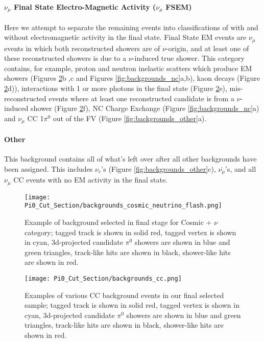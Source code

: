 \paragraph{ $\nu_\mu$ Final State Electro-Magnetic Activity ($\nu_\mu$ FSEM)}
Here we attempt to separate the remaining events into classifications of with and without electromagnetic activity in the final state.  Final State EM events are $\nu_\mu$ events in which both reconstructed showers are of $\nu$-origin, and at least one of these reconstructed showers is due to a $\nu$-induced true shower. This category contains, for example, proton and neutron inelastic scatters which produce EM showers (Figures \ref{fig:backgrounds_cc}b ,c and Figures \ref{fig:backgrounds_nc}a,b), kaon decays (Figure \ref{fig:backgrounds_cc}d)),  interactions with 1 or more photons in the final state (Figure \ref{fig:backgrounds_cc}e), mis-reconstructed events where at least one reconstructed candidate is from a $\nu$-induced shower (Figure \ref{fig:backgrounds_cc}f), NC Charge Exchange (Figure \ref{fig:backgrounds_nc}a) and $\nu_\mu$ CC 1$\pi^0$ out of the FV (Figure \ref{fig:backgrounds_other}a).

\paragraph{Other}
This background contains all of what's left over after all other backgrounds have been assigned.  This includes $\nu_e$'s (Figure \ref{fig:backgrounds_other}c), $\overline{\nu_\mu}$'s, and all $\nu_\mu$ CC events with no EM activity in the final state.

\begin{figure}[h!]
\centering
\texttt{[image: Pi0\_Cut\_Section/backgrounds\_cosmic\_neutrino\_flash.png]}
\caption{ Example of background selected in final stage for Cosmic + $\nu$ category; tagged track is shown in solid red, tagged vertex is shown in cyan, 3d-projected candidate $\pi^0$ showers are shown in blue and green triangles, track-like hits are shown in black, shower-like hits are shown in red. }
\label{fig:backgrounds_cosmic_nuflash}
\end{figure}


\begin{figure}[h!]
\centering
\texttt{[image: Pi0\_Cut\_Section/backgrounds\_cc.png]}
\caption{ Examples of various CC background events in our final selected sample; tagged track is shown in solid red, tagged vertex is shown in cyan, 3d-projected candidate $\pi^0$ showers are shown in blue and green triangles, track-like hits are shown in black, shower-like hits are shown in red. }
\label{fig:backgrounds_cc}
\end{figure}

